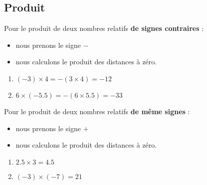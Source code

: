 \subsection{Produit}

\begin{propriete}
    Pour le produit de deux nombres relatifs {\bf de signes contraires} :
    \begin{itemize}
        \item nous prenons le signe \( -\)
        \item nous calculons le produit des distances à zéro.
    \end{itemize}

    \begin{example}
        \begin{enumerate}
            \item
                \( (-3)\times 4=-(3\times 4)=-12\)
            \item
                \( 6\times(-5.5)=-(6\times 5.5)=-33\)
        \end{enumerate}
    \end{example}

    Pour le produit de deux nombres relatifs {\bf de même signes} :
    \begin{itemize}
        \item nous prenons le signe \( +\)
        \item nous calculons le produit des distances à zéro.
    \end{itemize}
    
    \begin{example}
        \begin{enumerate}
            \item
                \( 2.5\times 3=4.5\)
            \item
                \( (-3)\times (-7)=21\)
        \end{enumerate}
    \end{example}

\end{propriete}
